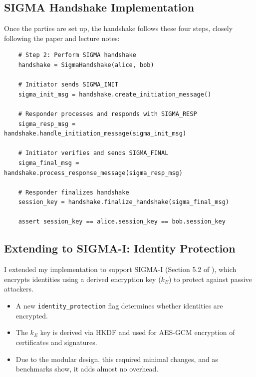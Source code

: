 \documentclass[twoside,a4paper,12pt]{article}
\newcommand{\setmonofontblock}{\setmonofont{LigaSFMonoNerdFont-SemiBold}}
\newcommand{\resetmonofont}{\setmonofont{Latin Modern Mono}}
\begin{document}
\subsection{SIGMA Handshake Implementation}
\label{subsec:sigma_handshake}

Once the parties are set up, the handshake follows these four steps, closely following the paper and lecture notes:


\setmonofontblock
\begin{verbatim}
    # Step 2: Perform SIGMA handshake
    handshake = SigmaHandshake(alice, bob)

    # Initiator sends SIGMA_INIT
    sigma_init_msg = handshake.create_initiation_message()

    # Responder processes and responds with SIGMA_RESP
    sigma_resp_msg = handshake.handle_initiation_message(sigma_init_msg)

    # Initiator verifies and sends SIGMA_FINAL
    sigma_final_msg = handshake.process_response_message(sigma_resp_msg)

    # Responder finalizes handshake
    session_key = handshake.finalize_handshake(sigma_final_msg)

    assert session_key == alice.session_key == bob.session_key
\end{verbatim}
\resetmonofont


\subsection{Extending to SIGMA-I: Identity Protection}
\label{subsec:sigma_identity_protection}

I extended my implementation to support SIGMA-I (Section 5.2 of \cite{SIGMA}), which encrypts identities using a derived encryption key ($k_E$) to protect against passive attackers.

\begin{itemize}
    \item A new \texttt{identity_protection} flag determines whether identities are encrypted.
    \item The $k_E$ key is derived via HKDF and used for AES-GCM encryption of certificates and signatures.
    \item Due to the modular design, this required minimal changes, and as benchmarks show, it adds almost no overhead.
\end{itemize}
\end{document}
